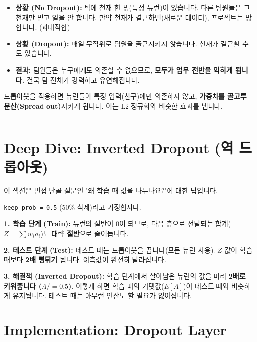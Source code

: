 \documentclass[11pt,a4paper]{book}
\theoremstyle{definition}
\begin{document}
\begin{analogybox}[title={천재에게 의존하는 팀 프로젝트}]
\begin{itemize}
    \item \textbf{상황 (No Dropout):} 팀에 천재 한 명(특정 뉴런)이 있습니다. 다른 팀원들은 그 천재만 믿고 일을 안 합니다. 만약 천재가 결근하면(새로운 데이터), 프로젝트는 망합니다. (과대적합)
    \item \textbf{상황 (Dropout):} 매일 무작위로 팀원을 출근시키지 않습니다. 천재가 결근할 수도 있습니다.
    \item \textbf{결과:} 팀원들은 누구에게도 의존할 수 없으므로, \textbf{모두가 업무 전반을 익히게 됩니다.} 결국 팀 전체가 강력하고 유연해집니다.
\end{itemize}
\end{analogybox}
드롭아웃을 적용하면 뉴런들이 특정 입력(친구)에만 의존하지 않고, \textbf{가중치를 골고루 분산(Spread out)}시키게 됩니다. 이는 L2 정규화와 비슷한 효과를 냅니다.

\vspace{0.5cm}\hrule\vspace{0.5cm}

\section{Deep Dive: Inverted Dropout (역 드롭아웃)}

이 섹션은 면접 단골 질문인 "왜 학습 때 값을 나누나요?"에 대한 답입니다.

\begin{mathbox}[title={The Scale Problem}]
\texttt{keep\_prob = 0.5} (50\% 삭제)라고 가정합시다.

\textbf{1. 학습 단계 (Train):}
뉴런의 절반이 0이 되므로, 다음 층으로 전달되는 합계($Z = \sum w_i a_i$)도 대략 \textbf{절반}으로 줄어듭니다.

\textbf{2. 테스트 단계 (Test):}
테스트 때는 드롭아웃을 끕니다(모든 뉴런 사용). $Z$ 값이 학습 때보다 \textbf{2배 뻥튀기} 됩니다. 예측값이 완전히 달라집니다.

\textbf{3. 해결책 (Inverted Dropout):}
학습 단계에서 살아남은 뉴런의 값을 미리 \textbf{2배로 키워줍니다 ($A /= 0.5$)}.
이렇게 하면 학습 때의 기댓값($E[A]$)이 테스트 때와 비슷하게 유지됩니다. 테스트 때는 아무런 연산도 할 필요가 없어집니다.
\end{mathbox}

\section{Implementation: Dropout Layer}
\end{document}
